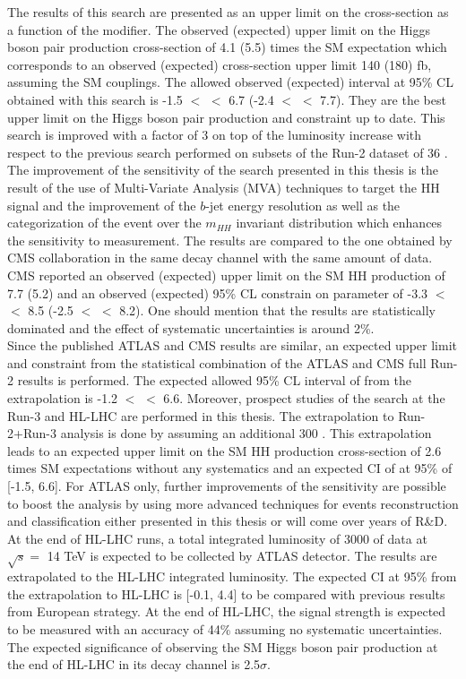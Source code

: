 The results of this search are presented as an upper limit on the cross-section as a function of the \kl modifier. The observed (expected) upper limit on the Higgs boson pair production cross-section of 4.1 (5.5) times the SM expectation which corresponds to an observed (expected) cross-section upper limit 140 (180) fb, assuming the SM couplings. The allowed observed (expected) interval at 95\% CL obtained with this search is -1.5 $<$ \kl $<$ 6.7 (-2.4 $<$ \kl $<$ 7.7). They are the best upper limit on the Higgs boson pair production and \kl constraint up to date. This search is improved with a factor of 3 on top of the luminosity increase with respect to the previous search performed on subsets of the Run-2 dataset of 36 \ifb. The improvement of the sensitivity of the search presented in this thesis is the result of the use of Multi-Variate Analysis (MVA) techniques to target the HH signal and the improvement of the $b$-jet energy resolution as well as the categorization of the event over the $m_{HH}$ invariant distribution which enhances the sensitivity to \kl measurement. The results are compared to the one obtained by CMS collaboration in the same decay channel with the same amount of data. CMS reported an observed (expected) upper limit on the SM HH production of 7.7 (5.2) and an observed (expected) 95\% CL constrain on \kl parameter of -3.3 $<$ \kl $<$ 8.5 (-2.5 $<$ \kl $<$ 8.2). One should mention that the results are statistically dominated and the effect of systematic uncertainties is around 2\%. \\

Since the published ATLAS and CMS results are similar, an expected upper limit and \kl constraint from the statistical combination of the ATLAS and CMS full Run-2 \HHyybb results is performed. The expected allowed 95\% CL interval of \kl from the extrapolation is -1.2 $<$ \kl $<$ 6.6. Moreover, prospect studies of the \HHyybb search at the Run-3 and HL-LHC are performed in this thesis. The extrapolation to Run-2+Run-3 analysis is done by assuming an additional 300 \ifb. This extrapolation leads to an expected upper limit on the SM HH production cross-section of 2.6 times SM expectations without any systematics and an expected CI of \kl at 95\% of [-1.5, 6.6]. For ATLAS only, further improvements of the sensitivity are possible to boost the \HHyybb analysis by using more advanced techniques for events reconstruction and classification either presented in this thesis or will come over years of R\&D. At the end of HL-LHC runs, a total integrated luminosity of 3000 \ifb of data at $\sqrt{s} = $ 14 TeV is expected to be collected by ATLAS detector. The \HHyybb results are extrapolated to the HL-LHC integrated luminosity. The expected \kl CI at 95\% from the extrapolation to HL-LHC is [-0.1, 4.4] to be compared with previous results from European strategy. At the end of HL-LHC, the signal strength is expected to be measured with an accuracy of 44\% assuming no systematic uncertainties. The expected significance of observing the SM Higgs boson pair production at the end of HL-LHC in its \bbyy decay channel is 2.5$\sigma$.

